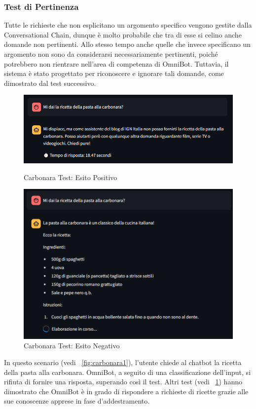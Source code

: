 \subsubsection{Test di Pertinenza}
Tutte le richieste che non esplicitano un argomento specifico vengono gestite dalla Conversational Chain, dunque è molto probabile che tra di esse si celino anche domande non pertinenti. Allo stesso tempo anche quelle che invece specificano un argomento non sono da considerarsi necessariamente pertinenti, poiché potrebbero non rientrare nell'area di competenza di OmniBot. Tuttavia, il sistema è stato progettato per riconoscere e ignorare tali domande, come dimostrato dal test successivo.
\begin{figure}[!t]
    \centering
    \includegraphics[width=\textwidth]{Images/cap5/carbonara.PNG}
    \caption{Carbonara Test: Esito Positivo}
    \label{fig:carbonara1}
    \vspace{0.5cm}
    \includegraphics[width=\textwidth]{Images/cap5/carbonara_test_failed.PNG}
    \caption{Carbonara Test: Esito Negativo}
    \label{fig:carbonara2}
\end{figure}

In questo scenario (vedi \figurename{~\ref{fig:carbonara1}}), l'utente chiede al chatbot la ricetta della pasta alla carbonara. OmniBot, a seguito di una classificazione dell'input, si rifiuta di fornire una risposta, superando così il test.
Altri test (vedi \figurename{~\ref{fig:carbonara2}}) hanno dimostrato che OmniBot è in grado di rispondere a richieste di ricette grazie alle sue conoscenze apprese in fase d'addestramento.

